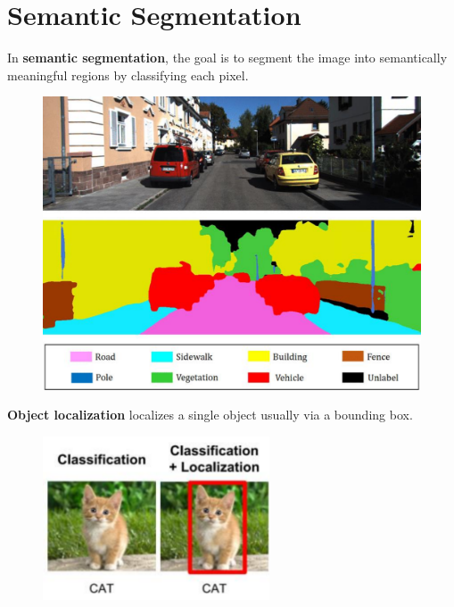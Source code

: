 \documentclass{report}
\begin{document}
\section{Semantic Segmentation}

\begin{definition}
    In \textbf{semantic segmentation}, the goal is to segment the image into semantically meaningful regions by classifying each pixel.

    \begin{figure}[H]
        \centering
        \includegraphics[width=1.0\textwidth]{.././assets/8.20.png}
    \end{figure}
\end{definition}

\begin{definition}
    \textbf{Object localization} localizes a single object usually via a bounding box.

    \begin{figure}[H]
        \centering
        \includegraphics[width=0.6\textwidth]{.././assets/8.21.png}
    \end{figure}
\end{definition}
\end{document}
